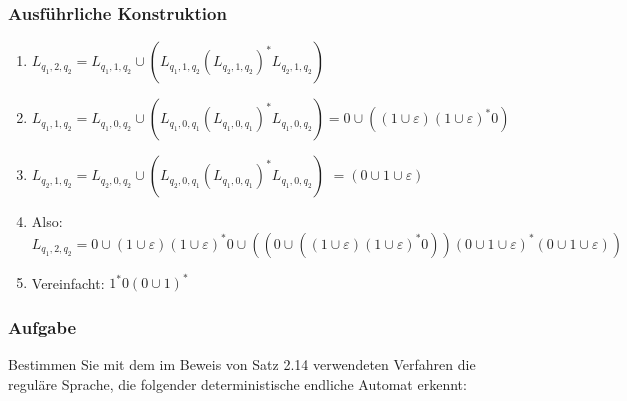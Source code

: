 \begin{frame}
\frametitle{Ausführliche Konstruktion}
\vspace{-1cm}
\begin{figure}[H]
\begin{center}
\end{center}
\end{figure}
\begin{enumerate}
\item $L_{q_1,2,q_2} = L_{q_1,1,q_2}\cup(L_{q_1,1,q_2}(L_{q_2,1,q_2})^*L_{q_2,1,q_2})$
\item $L_{q_1,1,q_2} = L_{q_1,0,q_2}\cup(L_{q_1,0,q_1}(L_{q_1,0,q_1})^*L_{q_1,0,q_2}) = 0\cup((1\cup\varepsilon)(1\cup\varepsilon)^*0)$
\item $L_{q_2,1,q_2} = L_{q_2,0,q_2}\cup(L_{q_2,0,q_1}(L_{q_1,0,q_1})^*L_{q_1,0,q_2})$ $ = (0\cup1\cup\varepsilon)$
\item Also: $L_{q_1,2,q_2} = 0\cup(1\cup\varepsilon)(1\cup\varepsilon)^*0\cup((0\cup((1\cup\varepsilon)(1\cup\varepsilon)^*0))(0\cup1\cup\varepsilon)^*(0\cup1\cup\varepsilon))$
\item Vereinfacht: $1^*0(0\cup1)^*$
\end{enumerate}
\end{frame}

\begin{frame}[t]
\frametitle{Aufgabe}
Bestimmen Sie  mit dem im Beweis von Satz 2.14 verwendeten Verfahren die 
reguläre Sprache, die folgender deterministische endliche Automat erkennt:
\begin{figure}[H]
\begin{center}
\end{center}
\end{figure}
\end{frame}

